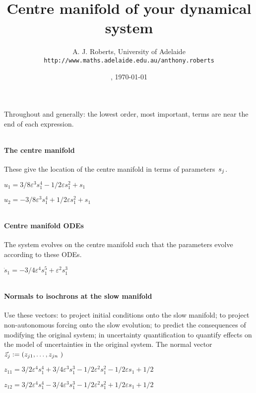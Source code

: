 \documentclass[11pt,a5paper]{article}
\title{Centre manifold of your dynamical system}
\author{A. J. Roberts, University of Adelaide\\
\texttt{http://www.maths.adelaide.edu.au/anthony.roberts}}
\date{\now, \today}
\def\eps{\varepsilon}
\begin{document}
\maketitle
Throughout and generally: the lowest order, most
important, terms are near the end of each expression.


\(
\)
\paragraph{The centre manifold}
These give the location of the centre manifold in
terms of parameters~\(s\sb j\).
\(
\)\par

\(u_{1}=3/8 \eps^{3} s_{1}^{4}-1/2 \eps s_{1}^{2}+s_{1}
\)\par

\(u_{2}=-3/8 \eps^{3} s_{1}^{4}+1/2 \eps s_{1}^{2}+s_{1}
\)\par

\(
\)
\paragraph{Centre manifold ODEs}
The system evolves on the centre manifold such
that the parameters evolve according to these ODEs.
\(
\)\par

\(\dot s_{1}=-3/4 \eps^{4} s_{1}^{5}+\eps^{2} s_{1}^{3}
\)\par

\(
\)
\paragraph{Normals to isochrons at the slow manifold}
Use these vectors: to project initial conditions
onto the slow manifold; to project non-autonomous
forcing onto the slow evolution; to predict the
consequences of modifying the original system; in
uncertainty quantification to quantify effects on
the model of uncertainties in the original system.
The normal vector \(\vec z\sb j:=(z\sb{j1},\ldots,z\sb{jn}\
)\)
\(
\)\par

\(z_{11}=3/2 \eps^{4} s_{1}^{4}+3/4 \eps^{3} s_{1}^{3}-1/2 \eps^{2} s_{1}
^{2}-1/2 \eps s_{1}+1/2
\)\par

\(z_{12}=3/2 \eps^{4} s_{1}^{4}-3/4 \eps^{3} s_{1}^{3}-1/2 \eps^{2} s_{1}
^{2}+1/2 \eps s_{1}+1/2
\)\par
\end{document}
